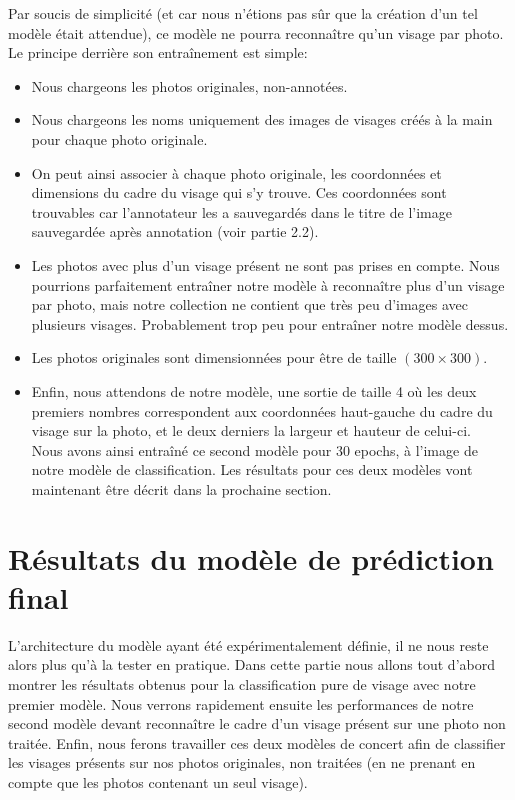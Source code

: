 \documentclass{article}
\begin{document}
Par soucis de simplicité (et car nous n'étions pas sûr que la création d'un tel modèle était attendue), ce modèle ne pourra reconnaître qu'un visage par photo. Le principe derrière son entraînement est simple:
\begin{itemize}
  \item Nous chargeons les photos originales, non-annotées.
  \item Nous chargeons les noms uniquement des images de visages créés à la main pour chaque photo originale.
  \item On peut ainsi associer à chaque photo originale, les coordonnées et dimensions du cadre du visage qui s'y trouve. Ces coordonnées sont trouvables car l'annotateur les a sauvegardés dans le titre de l'image sauvegardée après annotation (voir partie 2.2).
  \item Les photos avec plus d'un visage présent ne sont pas prises en compte. Nous pourrions parfaitement entraîner notre modèle à reconnaître plus d'un visage par photo, mais notre collection ne contient que très peu d'images avec plusieurs visages. Probablement trop peu pour entraîner notre modèle dessus.
  \item Les photos originales sont dimensionnées pour être de taille $(300\times300)$.
  \item Enfin, nous attendons de notre modèle, une sortie de taille 4 où les deux premiers nombres correspondent aux coordonnées haut-gauche du cadre du visage sur la photo, et le deux derniers la largeur et hauteur de celui-ci. \\
  
  Nous avons ainsi entraîné ce second modèle pour 30 epochs, à l'image de notre modèle de classification. Les résultats pour ces deux modèles vont maintenant être décrit dans la prochaine section.
\end{itemize}





\section{Résultats du modèle de prédiction final}
L'architecture du modèle ayant été expérimentalement définie, il ne nous reste alors plus qu'à la tester en pratique. Dans cette partie nous allons tout d'abord montrer les résultats obtenus pour la classification pure de visage avec notre premier modèle. Nous verrons rapidement ensuite les performances de notre second modèle devant reconnaître le cadre d'un visage présent sur une photo non traitée. Enfin, nous ferons travailler ces deux modèles de concert afin de classifier les visages présents sur nos photos originales, non traitées (en ne prenant en compte que les photos contenant un seul visage).
\end{document}
